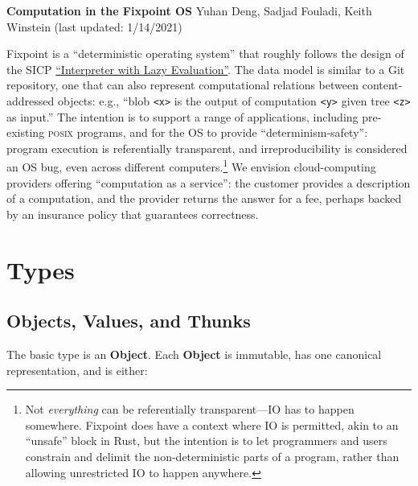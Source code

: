 \documentclass{article}
\newcommand{\valuexs}{\textbf{Value}s\xspace}
\newcommand{\object}{\textbf{Object}\xspace}
\newcommand{\objects}{\textbf{Object}s\xspace}
\newcommand{\thunks}{\textbf{Thunk}s\xspace}
\newcommand{\bs}{\vspace{\baselineskip}}
\begin{document}
\thispagestyle{empty}

\textbf{Computation in the Fixpoint OS}\newline
Yuhan Deng, Sadjad Fouladi, Keith Winstein (last updated: 1/14/2021)

\bs

Fixpoint is a ``deterministic operating system'' that roughly follows
the design of the SICP
\href{https://mitpress.mit.edu/sites/default/files/sicp/full-text/book/book-Z-H-27.html#\%_sec_4.2.2}{``Interpreter
  with Lazy Evaluation''}. The data model is similar to a Git
repository, one that can also represent computational relations
between content-addressed objects: e.g., ``blob \texttt{<x>} is the
output of computation \texttt{<y>} given tree \texttt{<z>} as input.''
The intention is to support a range of applications, including
pre-existing \textsc{posix} programs, and for the OS to provide
``determinism-safety'': program execution is referentially
transparent, and irreproducibility is considered an OS bug, even
across different computers.\footnote{Not \emph{everything} can be
referentially transparent---IO has to happen somewhere. Fixpoint does have a
context where IO is permitted, akin to an ``unsafe'' block in Rust,
but the intention is to let programmers and users constrain and
delimit the non-deterministic parts of a program, rather than allowing
unrestricted IO to happen anywhere.} We envision cloud-computing
providers offering ``computation as a service'': the customer provides
a description of a computation, and the provider returns the answer
for a fee, perhaps backed by an insurance policy that guarantees
correctness.


\section{Types}

\subsection{\objects, \valuexs, and \thunks}

The basic type is an \object. Each \object is immutable, has one canonical representation, and is either:
\end{document}
